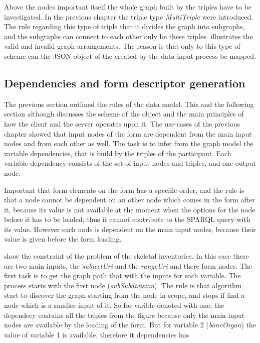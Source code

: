 

Above the nodes important itself the whole graph built by the triples have to be investigated. In the previous chapter the triple type \textit{MultiTriple} were introduced. The rule regarding this type of triple that it divides the graph into subgraphs, and the subgraphs can connect to each other only be these triples.  illustrates the valid and invalid graph arrangements. The reason is that only to this type of scheme can the JSON object of the created by the data input process be mapped.



\subsection{Dependencies and form descriptor generation}  \label{512}


The previous section outlined the rules of the data model. This and the following section although discusses the scheme of the object and the main principles of how the client and the server operates upon it. 
The use-cases of the previous chapter showed that input nodes of the form are dependent from the main input nodes and from each other as well. The task is to infer from the graph model the variable dependencies, that is build by the triples of the participant. Each variable dependency consists of the set of input nodes and triples, and one output node. 

Important that form elements on the form has a specific order, and the rule is that a node cannot be dependent on an other node which comes in the form after it, because its value is not available at the moment when the options for the node before it has to be loaded, thus it cannot contribute to the SPARQL query with its value. However each node is dependent on the main input nodes, because their value is given before the form loading.




 show the constraint of the problem of the skeletal inventories. In this case there are two main inputs, the \textit{subjectUri} and the \textit{rangeUri} and there form nodes.
The first task is to get the graph path that with the inputs for each variable. The process starts with the first node (\textit{subSubdivision}). The rule is that algorithm start to discover the graph starting from the node in scope, and stops if find a node which is a smaller input of it. So for varible denoted with one, the dependecy contains all the triples from the figure because only the main input nodes are available by the loading of the form. But for variable 2 (\textit{boneOrgan}) the value of variable 1 is available, therefore it dependencies has 

